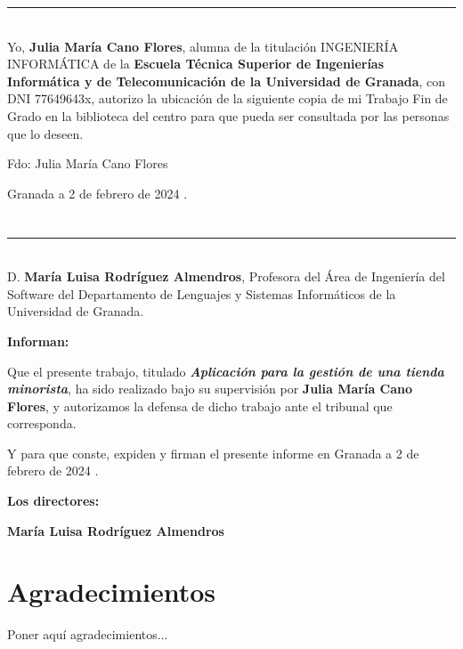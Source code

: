 

\noindent\rule[-1ex]{\textwidth}{2pt}\\[4.5ex]

Yo, \textbf{Julia María Cano Flores}, alumna de la titulación INGENIERÍA INFORMÁTICA de la \textbf{Escuela Técnica Superior
de Ingenierías Informática y de Telecomunicación de la Universidad de Granada}, con DNI 77649643x, autorizo la
ubicación de la siguiente copia de mi Trabajo Fin de Grado en la biblioteca del centro para que pueda ser
consultada por las personas que lo deseen.

\vspace{6cm}

\noindent Fdo: Julia María Cano Flores

\vspace{2cm}

\begin{flushright}
Granada a 2 de febrero de 2024 .
\end{flushright}


\chapter*{}

\noindent\rule[-1ex]{\textwidth}{2pt}\\[4.5ex]

D. \textbf{María Luisa Rodríguez Almendros}, Profesora del Área de Ingeniería del Software del Departamento de Lenguajes y Sistemas Informáticos de la Universidad de Granada.




\vspace{0.5cm}

\textbf{Informan:}

\vspace{0.5cm}

Que el presente trabajo, titulado \textit{\textbf{Aplicación para la gestión de una tienda minorista}},
ha sido realizado bajo su supervisión por \textbf{Julia María Cano Flores}, y autorizamos la defensa de dicho trabajo ante el tribunal
que corresponda.

\vspace{0.5cm}

Y para que conste, expiden y firman el presente informe en Granada a 2 de febrero de 2024 .

\vspace{1cm}

\textbf{Los directores:}

\vspace{5cm}

\noindent \textbf{María Luisa Rodríguez Almendros}

\chapter*{Agradecimientos}
\thispagestyle{empty}

       \vspace{1cm}


Poner aquí agradecimientos...



